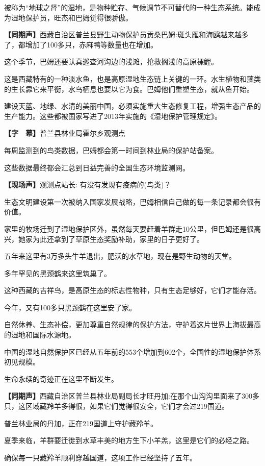 \documentclass{ctexart}
\newcommand{\zkh}[1]{\textbf{\hspace{-2.7em} 【#1】}}
\begin{document}
被称为``地球之肾''的湿地，是物种贮存、气候调节不可替代的一种生态系统。能成为湿地保护员，旺杰和巴姆觉得很骄傲。

 \zkh{同期声}西藏自治区普兰县野生动物保护员贡桑巴姆:斑头雁和海鸥越来越多了，都增加了100多只，赤麻鸭等数量也在增加。

 这个季节，巴姆还要认真巡查河沟边的浅滩，抢救搁浅的高原裸鲤。

这是西藏特有的一种淡水鱼，也是高原湿地生态链上关键的一环。水生植物和藻类的生长靠它来平衡，水鸟栖息也要以它为食。巴姆他们重塑生态，就从鱼开始。

建设天蓝、地绿、水清的美丽中国，必须实施重大生态修复工程，增强生态产品的生产能力。这些都被国家写进了2013年实施的《湿地保护管理规定》。

 \zkh{字　幕}普兰县林业局霍尔乡观测点

 每周监测到的鸟类数据，巴姆都会第一时间到林业局的保护站备案。

 这些数据最终都会汇总到日益完善的全国生态环境监测网。

 \zkh{现场声}观测点站长: 有没有发现有疫病的(鸟类)？

 
生态文明建设第一次被纳入国家发展战略，巴姆相信自己做的每一条记录都会很有价值。

 
家里的牧场迁到了湿地保护区外，虽然每天要赶着羊群走10公里，但巴姆还是很高兴，她家为此还拿到了草原生态奖励补助，家里的日子更好了。

 五年来这里有3万多头牛羊退出，肥沃的水草地，现在是野生动物的天堂。

 多年罕见的黑颈鹤来这里筑巢了。

 这种西藏的吉祥鸟，是高原生态的标志性物种，只有生态足够好，它们才能存活。

 今年，又有100多只黑颈鹤在这里安了家。

自然休养、生态补偿，更加尊重自然规律的保护方法，守护着这片世界上海拔最高的湿地和国际水源地。

中国的湿地自然保护区已经从五年前的553个增加到602个，全国性的湿地保护体系初见规模。

 生命永续的奇迹正在这里不断发生。

 \zkh{同期声}西藏自治区普兰县林业局副局长才旺丹加:在那个山沟沟里面来了300多只，这区域藏羚羊多得很，如果它们觉得很安全，它们才会过219国道。

 普兰林业局的丹加，正在219国道上守护藏羚羊。

 夏季来临，羊群要迁徙到水草丰美的地方生下小羊羔，这里是它们的必经之路。

 确保每一只藏羚羊顺利穿越国道，这项工作已经坚持了五年。
\end{document}
